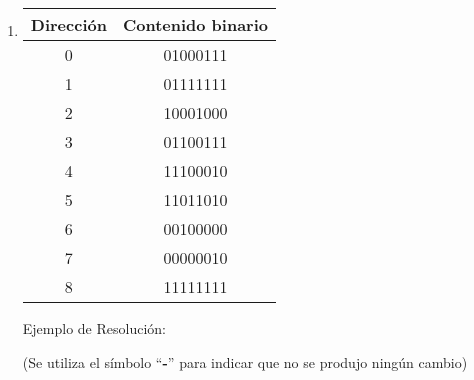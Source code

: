 \documentclass[12pt]{article}
\begin{document}
\begin{enumerate}

\item \begin{tabular}{| c | c |}
        \hline
        \textbf{Dirección}&\textbf{Contenido binario}\\
        \hline \hline
        0 & 01000111 \\
        \hline
        1 & 01111111 \\
        \hline
        2 & 10001000 \\
        \hline
        3 & 01100111 \\
        \hline
        4 & 11100010 \\
        \hline
        5 & 11011010 \\
        \hline
        6 & 00100000 \\
        \hline
        7 & 00000010 \\
        \hline
        8 & 11111111 \\
        \hline
        \hline
\end{tabular}

Ejemplo de Resolución:

{\tiny(Se utiliza el símbolo ``\textbf{-}'' para indicar que no se produjo
        ningún cambio)}


\end{enumerate}
\end{document}
